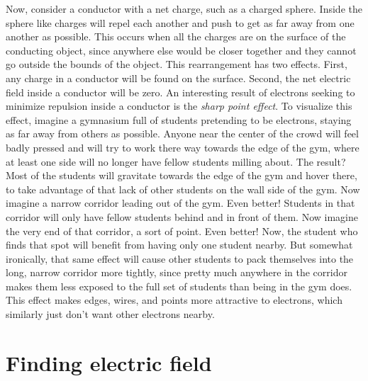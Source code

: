 \documentclass[nobib]{tufte-handout}
\begin{document}
Now, consider a conductor with a net charge, such as a charged sphere.
Inside the sphere like charges will repel each another and push 
to get as far away from one another as possible. This occurs when
all the charges are on the surface of the conducting object, since anywhere 
else would be closer together and they cannot go outside the 
bounds of the object. This rearrangement has two effects.
First, any charge in a conductor will be found on the surface.
Second, the net electric field inside a conductor will be zero. 
An interesting result of electrons seeking to minimize repulsion inside a conductor is 
the \emph{sharp point effect}. To visualize this effect, imagine a gymnasium full of students 
pretending to be electrons, staying as far away from others as possible. 
Anyone near the center of the crowd will feel badly pressed and will try 
to work there way towards the edge of the gym, where at least one side 
will no longer have fellow students milling about. The result? 
Most of the students will gravitate towards the edge of the gym 
and hover there, to take advantage of that lack of other students 
on the wall side of the gym. Now imagine a narrow corridor leading out of the gym. 
Even better! Students in that corridor will only have 
fellow students behind and in front of them.
Now imagine the very end of that corridor, a sort of point. 
Even better! Now, the student who finds that spot will benefit 
from having only one student nearby. But somewhat ironically, 
that same effect will cause other students to pack themselves 
into the long, narrow corridor more tightly, since pretty 
much anywhere in the corridor makes them less exposed to the 
full set of students than being in the gym does.
This effect makes edges, wires, and points more attractive to electrons, 
which similarly just don't want other electrons nearby.

\pagebreak 

\section{Finding electric field}
\end{document}
